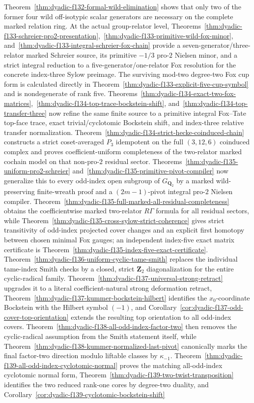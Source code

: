 \documentclass[11pt]{article}
\theoremstyle{definition}
\begin{document}
\begin{enumerate}[label=\textbf{(\arabic*)}]
Theorem~\ref{thm:dyadic-f132-formal-wild-elimination} shows that only two of the former four wild off-isotypic scalar generators are necessary on the complete marked relation ring.  At the actual group-relator level, Theorems~\ref{thm:dyadic-f133-schreier-pro2-presentation},~\ref{thm:dyadic-f133-primitive-wild-fox-minor}, and~\ref{thm:dyadic-f133-integral-schreier-fox-chain} provide a seven-generator/three-relator marked Schreier source, its primitive $-1/3$ pro-$2$ Nielsen minor, and a strict integral reduction to a five-generator/one-relator Fox resolution for the concrete index-three Sylow preimage.  The surviving mod-two degree-two Fox cup form is calculated directly in Theorem~\ref{thm:dyadic-f133-explicit-five-cup-symbol} and is nondegenerate of rank five.  Theorems~\ref{thm:dyadic-f134-exact-two-fox-matrices},~\ref{thm:dyadic-f134-top-trace-bockstein-shift}, and~\ref{thm:dyadic-f134-top-transfer-three} now refine the same finite source to a primitive integral Fox--Tate top-face trace, exact trivial/cyclotomic Bockstein shift, and index-three relative transfer normalization.  Theorem~\ref{thm:dyadic-f134-strict-hecke-coinduced-chain} constructs a strict coset-averaged $P_3$ idempotent on the full $(3,12,6)$ coinduced complex and proves coefficient-uniform completeness of the two-relator marked cochain model on that non-pro-$2$ residual sector.  Theorems~\ref{thm:dyadic-f135-uniform-pro2-schreier} and~\ref{thm:dyadic-f135-primitive-pivot-compiler} now generalize this to every odd-index open subgroup of $G_{\mathbf Q_2}$ by a marked wild-preserving finite-wreath proof and a $(2m-1)$-pivot integral pro-$2$ Nielsen compiler.  Theorem~\ref{thm:dyadic-f135-full-marked-all-residual-completeness} obtains the coefficientwise marked two-relator $R\Gamma$ formula for all residual sectors, while Theorem~\ref{thm:dyadic-f135-cross-sylow-strict-coherence} gives strict transitivity of odd-index projected cover changes and an explicit first homotopy between chosen minimal Fox gauges; an independent index-five exact matrix certificate is Theorem~\ref{thm:dyadic-f135-index-five-exact-certificate}.  Theorem~\ref{thm:dyadic-f136-uniform-cyclic-tame-smith} replaces the individual tame-index Smith checks by a closed, strict $\mathbf Z_2$ diagonalization for the entire cyclic-radical family.  Theorem~\ref{thm:dyadic-f137-universal-strong-retract} upgrades it to a literal coefficient-natural strong deformation retract, Theorem~\ref{thm:dyadic-f137-kummer-bockstein-hilbert} identifies the $x_0$-coordinate Bockstein with the Hilbert symbol $(-1)$, and Corollary~\ref{cor:dyadic-f137-odd-cover-top-orientation} extends the resulting top orientation to all odd-index covers.  Theorem~\ref{thm:dyadic-f138-all-odd-index-factor-two} then removes the cyclic-radical assumption from the Smith statement itself, while Theorem~\ref{thm:dyadic-f138-kummer-normalized-last-pivot} canonically marks the final factor-two direction modulo liftable classes by $\kappa_{-1}$.  Theorem~\ref{thm:dyadic-f139-all-odd-index-cyclotomic-normal} proves the matching all-odd-index cyclotomic normal form, Theorem~\ref{thm:dyadic-f139-two-twist-transposition} identifies the two reduced rank-one cores by degree-two duality, and Corollary~\ref{cor:dyadic-f139-cyclotomic-bockstein-shift} 
\end{enumerate}
\end{document}
